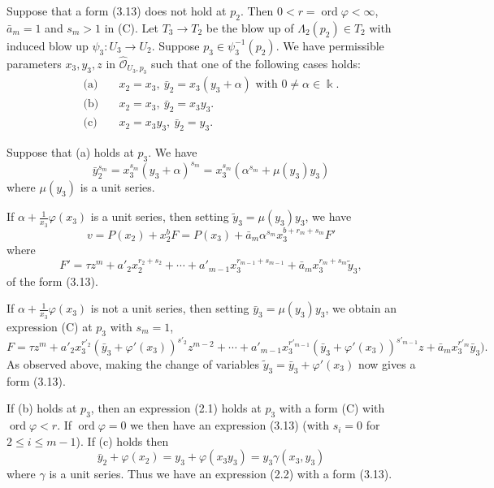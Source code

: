 \documentclass[11pt]{article}
\theoremstyle{plain}
\newcommand{\Oh}[1]{\widehat{\mathcal{O}}_{#1}}
\begin{document}
Suppose that a form (3.13) does not hold at $p_2$. Then $0 < r = \operatorname{ord} \varphi < \infty$, $\bar{a}_m = 1$ and $s_m > 1$ in (C). Let $T_3 \to T_2$ be the blow up of $\Lambda_2(p_2) \in T_2$ with induced blow up $\psi_3 : U_3 \to U_2$. Suppose $p_3 \in \psi_3^{-1}(p_2)$. We have permissible parameters $x_3, y_3, z$ in $\Oh{U_3,p_3}$ such that one of the following cases holds:
\begin{align*}
\text{(a)}\quad & x_2 = x_3,\ \bar{y}_2 = x_3(y_3 + \alpha) \text{ with } 0 \neq \alpha \in \Bbbk. \\
\text{(b)}\quad & x_2 = x_3,\ \bar{y}_2 = x_3 y_3. \\
\text{(c)}\quad & x_2 = x_3 y_3,\ \bar{y}_2 = y_3.
\end{align*}

Suppose that (a) holds at $p_3$. We have
\[
\bar{y}_2^{s_m} = x_3^{s_m}(y_3 + \alpha)^{s_m} = x_3^{s_m}(\alpha^{s_m} + \mu(y_3)y_3)
\]
where $\mu(y_3)$ is a unit series.

If $\alpha + \frac{1}{x_3}\varphi(x_3)$ is a unit series, then setting $\tilde{y}_3 = \mu(y_3)y_3$, we have
\[
v = P(x_2) + x_2^b F = P(x_3) + \bar{a}_m \alpha^{s_m} x_3^{b+r_m+s_m} F'
\]
where
\[
F' = \tau z^m + a'_2 x_2^{r_2+s_2} + \cdots + a'_{m-1} x_3^{r_{m-1}+s_{m-1}} + \bar{a}_m x_3^{r_m+s_m} \tilde{y}_3,
\]
of the form (3.13).

If $\alpha + \frac{1}{x_3}\varphi(x_3)$ is not a unit series, then setting $\bar{y}_3 = \mu(y_3)y_3$, we obtain an expression (C) at $p_3$ with $s_m = 1$,
\begin{equation}
F = \tau z^m + a'_2 x_3^{r'_2} (\bar{y}_3 + \varphi'(x_3))^{s'_2} z^{m-2} + \cdots + a'_{m-1} x_3^{r'_{m-1}} (\bar{y}_3 + \varphi'(x_3))^{s'_{m-1}} z + \bar{a}_m x_3^{r'_m} \bar{y}_3).
\tag{c3}
\end{equation}
As observed above, making the change of variables $\tilde{y}_3 = \bar{y}_3 + \varphi'(x_3)$ now gives a form (3.13).

If (b) holds at $p_3$, then an expression (2.1) holds at $p_3$ with a form (C) with $\operatorname{ord} \varphi < r$. If $\operatorname{ord} \varphi = 0$ we then have an expression (3.13) (with $s_i = 0$ for $2 \leqslant i \leqslant m-1$). If (c) holds then
\[
\bar{y}_2 + \varphi(x_2) = y_3 + \varphi(x_3 y_3) = y_3 \gamma(x_3, y_3)
\]
where $\gamma$ is a unit series. Thus we have an expression (2.2) with a form (3.13).
\end{document}
